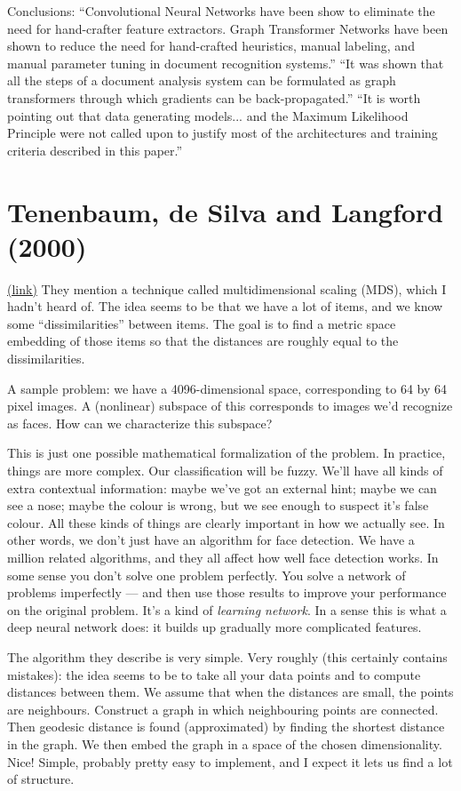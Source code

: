 \documentclass[12pt]{report}
\newcommand{\link}[2]{\href{#1}{#2}}
\begin{document}
Conclusions: ``Convolutional Neural Networks have been show to
eliminate the need for hand-crafter feature extractors.  Graph
Transformer Networks have been shown to reduce the need for
hand-crafted heuristics, manual labeling, and manual parameter tuning
in document recognition systems.''  ``It was shown that all the steps
of a document analysis system can be formulated as graph transformers
through which gradients can be back-propagated.''  ``It is worth
pointing out that data generating models... and the Maximum Likelihood
Principle were not called upon to justify most of the architectures
and training criteria described in this paper.''


\section{Tenenbaum, de Silva and Langford (2000)}

\link{http://scholar.google.ca/scholar?cluster=14602426245887619907&hl=en&as_sdt=0,5}{(link)}
They mention a technique called multidimensional scaling (MDS), which
I hadn't heard of.  The idea seems to be that we have a lot of items,
and we know some ``dissimilarities'' between items.  The goal is to
find a metric space embedding of those items so that the distances are
roughly equal to the dissimilarities.

A sample problem: we have a 4096-dimensional space, corresponding to
64 by 64 pixel images.  A (nonlinear) subspace of this corresponds to
images we'd recognize as faces.  How can we characterize this
subspace?  

This is just one possible mathematical formalization of the problem.
In practice, things are more complex.  Our classification will be
fuzzy.  We'll have all kinds of extra contextual information: maybe
we've got an external hint; maybe we can see a nose; maybe the colour
is wrong, but we see enough to suspect it's false colour.  All these
kinds of things are clearly important in how we actually see.  In
other words, we don't just have an algorithm for face detection.  We
have a million related algorithms, and they all affect how well face
detection works.  In some sense you don't solve one problem perfectly.
You solve a network of problems imperfectly --- and then use those
results to improve your performance on the original problem.  It's a
kind of \emph{learning network}.  In a sense this is what a deep
neural network does: it builds up gradually more complicated features.

The algorithm they describe is very simple.  Very roughly (this
certainly contains mistakes): the idea seems to be to take all your
data points and to compute distances between them.  We assume that
when the distances are small, the points are neighbours.  Construct a
graph in which neighbouring points are connected.  Then geodesic
distance is found (approximated) by finding the shortest distance in
the graph.  We then embed the graph in a space of the chosen
dimensionality.  Nice!  Simple, probably pretty easy to implement, and
I expect it lets us find a lot of structure.
\end{document}
